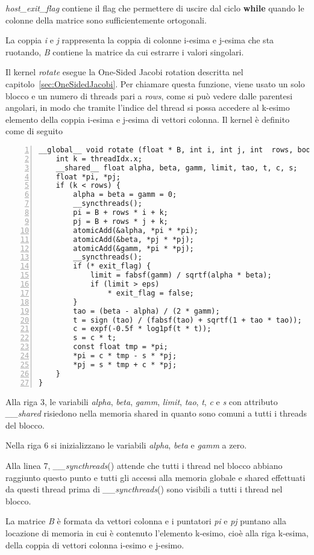 \textit{host\_exit\_flag} contiene il flag che permettere di uscire dal ciclo \textbf{while} quando le colonne della matrice sono sufficientemente ortogonali.

La coppia \textit{i} e \textit{j} rappresenta la coppia di colonne i-esima e j-esima che sta ruotando, \textit{B} contiene la matrice da cui estrarre i valori singolari.

Il kernel \textit{rotate} esegue la One-Sided Jacobi rotation descritta nel capitolo~\ref{sec:OneSidedJacobi}. Per chiamare questa funzione, viene usato un solo blocco e un numero di threads pari a \textit{rows}, come si può vedere dalle parentesi angolari, in modo che tramite l'indice del thread si possa accedere al k-esimo elemento della coppia i-esima e j-esima di vettori colonna. Il kernel è definito come di seguito
\begin{lstlisting}[numbers=left]
__global__ void rotate (float * B, int i, int j, int  rows, bool * exit_flag){
	int k = threadIdx.x; 
	__shared__ float alpha, beta, gamm, limit, tao, t, c, s;
	float *pi, *pj;
	if (k < rows) {
		alpha = beta = gamm = 0;
		__syncthreads();
		pi = B + rows * i + k;
		pj = B + rows * j + k;
		atomicAdd(&alpha, *pi * *pi);
		atomicAdd(&beta, *pj * *pj);	
		atomicAdd(&gamm, *pi * *pj);
		__syncthreads();
		if (* exit_flag) {
			limit = fabsf(gamm) / sqrtf(alpha * beta);
			if (limit > eps) 
				* exit_flag = false;
		}
		tao = (beta - alpha) / (2 * gamm);
		t = sign (tao) / (fabsf(tao) + sqrtf(1 + tao * tao)); 
		c = expf(-0.5f * log1pf(t * t)); 
		s = c * t;
		const float tmp = *pi;
		*pi = c * tmp - s * *pj;
		*pj = s * tmp + c * *pj;
	}
}
\end{lstlisting}
Alla riga 3, le variabili \textit{alpha}, \textit{beta}, \textit{gamm}, \textit{limit}, \textit{tao}, \textit{t}, \textit{c} e \textit{s} con attributo \textit{\_\_shared} risiedono nella memoria shared in quanto sono comuni a tutti i threads del blocco.

Nella riga 6 si inizializzano le variabili \textit{alpha}, \textit{beta} e \textit{gamm} a zero. 

Alla linea 7, \textit{\_\_syncthreads}() attende che tutti i thread nel blocco abbiano raggiunto questo punto e tutti gli accessi alla memoria globale e shared effettuati da questi thread prima di \textit{\_\_syncthreads}() sono visibili a tutti i thread nel blocco.

La matrice \textit{B} è formata da vettori colonna e i puntatori \textit{pi} e \textit{pj} puntano alla locazione di memoria in cui è contenuto l'elemento k-esimo, cioè alla riga k-esima, della coppia di vettori colonna i-esimo e j-esimo. 

